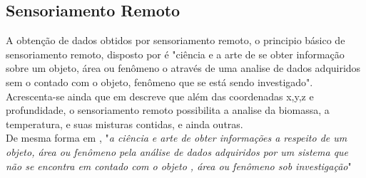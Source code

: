  \subsection{Sensoriamento Remoto}

  \hspace*{1.25 cm} A obtenção de dados obtidos por sensoriamento remoto, o principio básico de sensoriamento remoto, disposto por \cite[p.~24]{Reddy} é "ciência e a arte de se obter informação sobre um objeto, área ou  fenômeno o através de uma analise de dados adquiridos sem o contado com o objeto, fenômeno que se está sendo investigado".  Acrescenta-se ainda que em \cite[p.~7]{Jensensens} descreve que além das coordenadas x,y,z e profundidade, o sensoriamento remoto possibilita a analise da biomassa, a temperatura, e suas misturas contidas, e ainda outras. \\
  \hspace*{1.25 cm} De mesma forma em \cite[p.1]{Lilesat}, "\textit{a ciência e arte de obter informações a respeito de um objeto, área ou fenômeno pela análise de dados adquiridos por um sistema que não se encontra em contado com o objeto , área ou fenômeno sob investigação}" 
  
